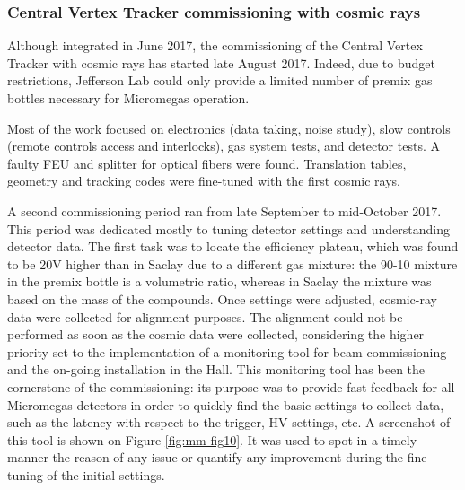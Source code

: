 \subsubsection{Central Vertex Tracker commissioning with cosmic rays}

Although integrated in June 2017, the commissioning of the Central Vertex Tracker with cosmic rays has started late August 2017. Indeed, due to budget restrictions, Jefferson Lab could only provide a limited number of premix gas bottles necessary for Micromegas operation. 

Most of the work focused on electronics (data taking, noise study), slow controls (remote controls access and interlocks), gas system tests, and detector tests. A faulty FEU and splitter for optical fibers were found. Translation tables, geometry and tracking codes were fine-tuned with the first cosmic rays. 

A second commissioning period ran from late September to mid-October 2017. This period was dedicated mostly to tuning detector settings and understanding detector data. The first task was to locate the efficiency plateau, which was found to be 20V higher than in Saclay due to a different gas mixture: the 90-10 mixture in the premix bottle is a volumetric ratio, whereas in Saclay the mixture was based on the mass of the compounds. Once settings were adjusted, cosmic-ray data were collected for alignment purposes. The alignment could not be performed as soon as the cosmic data were collected, considering the higher priority set to the implementation of a monitoring tool for beam commissioning and the on-going installation in the Hall. This monitoring tool has been the cornerstone of the commissioning: its purpose was to provide fast feedback for all Micromegas detectors in order to quickly find the basic settings to collect data, such as the latency with respect to the trigger, HV settings, etc. A screenshot of this tool is shown on Figure \ref{fig:mm-fig10}. It was used to spot in a timely manner the reason of any issue or quantify any improvement during the fine-tuning of the initial settings.


